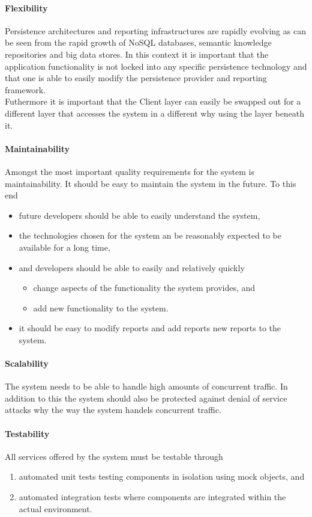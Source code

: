 \paragraph{Flexibility}
Persistence architectures and reporting infrastructures are rapidly evolving as can
be seen from the rapid growth of NoSQL databases, semantic knowledge repositories and big data
stores. In this context it is important that the application functionality is not locked into any
specific persistence technology and that one is able to easily modify the persistence provider and
reporting framework.\\
Futhermore it is important that the Client layer can easily be swapped out for a different
layer that accesses the system in a different why using the layer beneath it.
\paragraph{Maintainability}
Amongst the most important quality requirements for the system is
maintainability. It should be easy to maintain the system in the future. To this end

\begin{itemize}
\item future developers should be able to easily understand the system,
\item the technologies chosen for the system an be reasonably expected to be available for a long
time,
\item and developers should be able to easily and relatively quickly
	\begin{itemize}
		\item change aspects of the functionality the system provides, and
		\item add new functionality to the system.
	\end{itemize}
\item it should be easy to modify reports and add reports new reports to the system.
\end{itemize}

\paragraph{Scalability}
The system needs to be able to handle high amounts of concurrent traffic.
In addition to this the system should also be protected against
denial of service attacks why the way the system handels concurrent traffic.

\paragraph{Testability}
All services offered by the system must be testable through
\begin{enumerate}
	\item automated unit tests testing components in isolation using mock objects, and
	\item automated integration tests where components are integrated within the actual environment.
\end{enumerate}

